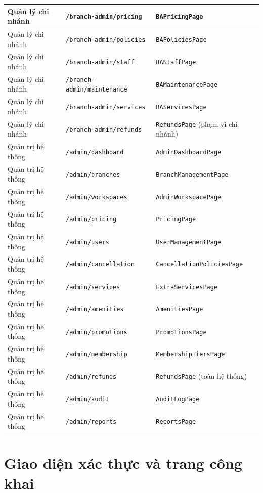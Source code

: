 {\begin{longtable}{|p{2.6cm}|p{5.4cm}|p{5.4cm}|}
\hline
Quản lý chi nhánh & \texttt{/branch-admin/pricing} & \texttt{BAPricingPage} \\
\hline
Quản lý chi nhánh & \texttt{/branch-admin/policies} & \texttt{BAPoliciesPage} \\
\hline
Quản lý chi nhánh & \texttt{/branch-admin/staff} & \texttt{BAStaffPage} \\
\hline
Quản lý chi nhánh & \texttt{/branch-admin/maintenance} & \texttt{BAMaintenancePage} \\
\hline
Quản lý chi nhánh & \texttt{/branch-admin/services} & \texttt{BAServicesPage} \\
\hline
Quản lý chi nhánh & \texttt{/branch-admin/refunds} & \texttt{RefundsPage} (phạm vi chi nhánh) \\
\hline
Quản trị hệ thống & \texttt{/admin/dashboard} & \texttt{AdminDashboardPage} \\
\hline
Quản trị hệ thống & \texttt{/admin/branches} & \texttt{BranchManagementPage} \\
\hline
Quản trị hệ thống & \texttt{/admin/workspaces} & \texttt{AdminWorkspacePage} \\
\hline
Quản trị hệ thống & \texttt{/admin/pricing} & \texttt{PricingPage} \\
\hline
Quản trị hệ thống & \texttt{/admin/users} & \texttt{UserManagementPage} \\
\hline
Quản trị hệ thống & \texttt{/admin/cancellation} & \texttt{CancellationPoliciesPage} \\
\hline
Quản trị hệ thống & \texttt{/admin/services} & \texttt{ExtraServicesPage} \\
\hline
Quản trị hệ thống & \texttt{/admin/amenities} & \texttt{AmenitiesPage} \\
\hline
Quản trị hệ thống & \texttt{/admin/promotions} & \texttt{PromotionsPage} \\
\hline
Quản trị hệ thống & \texttt{/admin/membership} & \texttt{MembershipTiersPage} \\
\hline
Quản trị hệ thống & \texttt{/admin/refunds} & \texttt{RefundsPage} (toàn hệ thống) \\
\hline
Quản trị hệ thống & \texttt{/admin/audit} & \texttt{AuditLogPage} \\
\hline
Quản trị hệ thống & \texttt{/admin/reports} & \texttt{ReportsPage} \\
\hline
\end{longtable}
}

\section{Giao diện xác thực và trang công khai}
\label{sec:gd_congkhai}


